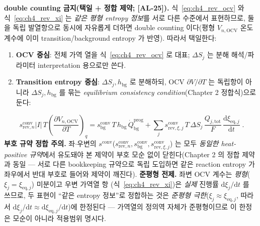 \documentclass[11pt,a4paper]{article}
\newcommand{\dd}{\mathrm{d}}
\newcommand{\eq}{\mathrm{eq}}
\newcommand{\bg}{\mathrm{bg}}
\newcommand{\OCV}{\mathrm{OCV}}
\newcommand{\tot}{\mathrm{tot}}
\newcommand{\rev}{\mathrm{rev}}
\newcommand{\conv}{\mathrm{conv}}
\newcommand{\prog}{\mathrm{prog}}
\newcommand{\AL}[1]{\textsf{[AL-#1]}}
\begin{document}
\textbf{double counting 금지(택일 + 정합 제약; \AL{25}).} 식~\eqref{eq:ch4_rev_ocv} 와 식~\eqref{eq:ch4_rev_xi}
는 \emph{같은 평형 entropy 정보}를 서로 다른 수준에서 표현하므로, 둘을 독립 발열항으로 동시에 자유롭게 더하면
double counting 이다(평형 $V_{n,\OCV}$ 온도계수에 이미 transition/background entropy 가 반영). 따라서 택일한다:
\begin{enumerate}[label=\Alph*),leftmargin=2.0em]
\item \textbf{OCV 중심}: 전체 가역 열을 식~\eqref{eq:ch4_rev_ocv} 로 대표; $\Delta S_j$ 는 분해 해석/파라미터
  interpretation 용으로만 쓴다.
\item \textbf{Transition entropy 중심}: $\Delta S_j,h_\bg$ 로 분해하되, OCV $\partial V/\partial T$ 는 독립항이
  아니라 $\Delta S_j,h_\bg$ 를 묶는 \emph{equilibrium consistency condition}(Chapter 2 정합식)으로 둔다:
\end{enumerate}
\begin{equation}
\boxed{\;s_{\rev,n}^{\conv}|I|\,T\left(\frac{\partial V_{n,\OCV}}{\partial T}\right)_q
=s_\bg^{\conv}\,T\,h_\bg\,\dot Q_\bg^{\prog}
+\sum_j s_{\rev,\xi,j}^{\conv}\,T\,\Delta S_j\,\frac{Q_{j,\tot}}{F}\,\frac{\dd\xi_{\eq,j}}{\dd t}\;.}
\label{eq:ch4_consistency}
\end{equation}
\textbf{부호 규약 정합 주의.} 좌$\cdot$우변의 $s^{\conv}$($s_{\rev,n}^{\conv},s_\bg^{\conv},s_{\rev,\xi,j}^{\conv}$)
는 모두 \emph{동일한 heat-positive 규약}에서 유도돼야 본 제약이 부호 모순 없이 닫힌다(Chapter 2 의 정합 제약과
동일 — 서로 다른 bookkeeping 규약으로 독립 도입하면 같은 reaction entropy 가 좌우에서 반대 부호로 들어와 제약이
깨진다). \textbf{준평형 전제.} 좌변 OCV 계수는 \emph{평형}($\xi_j=\xi_{\eq,j}$) 미분이고 우변 가역열 항
(식~\eqref{eq:ch4_rev_xi})은 \emph{실제} 진행률 $\dd\xi_j/\dd t$ 를 쓰므로, 두 표현이 ``같은 entropy 정보''로
정합하는 것은 \emph{준평형 극한}($\xi_j\approx\xi_{\eq,j}$, 따라서 $\dd\xi_j/\dd t\approx\dd\xi_{\eq,j}/\dd t$)에
한정된다 — 가역열의 정의역 자체가 준평형이므로 이 한정은 모순이 아니라 적용범위 명시다.

\end{document}
